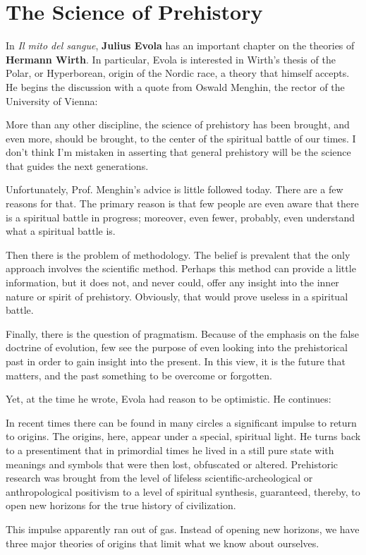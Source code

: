 \section{The Science of Prehistory}

In \emph{Il mito del sangue}, \textbf{Julius Evola} has an important chapter on the theories of \textbf{Hermann Wirth}. In particular, Evola is interested in Wirth's thesis of the Polar, or Hyperborean, origin of the Nordic race, a theory that himself accepts. He begins the discussion with a quote from Oswald Menghin, the rector of the University of Vienna: 

\begin{quotex}
More than any other discipline, the science of prehistory has been brought, and even more, should be brought, to the center of the spiritual battle of our times. I don't think I'm mistaken in asserting that general prehistory will be the science that guides the next generations. 

\end{quotex}
Unfortunately, Prof. Menghin's advice is little followed today. There are a few reasons for that. The primary reason is that few people are even aware that there is a spiritual battle in progress; moreover, even fewer, probably, even understand what a spiritual battle is. 

Then there is the problem of methodology. The belief is prevalent that the only approach involves the scientific method. Perhaps this method can provide a little information, but it does not, and never could, offer any insight into the inner nature or spirit of prehistory. Obviously, that would prove useless in a spiritual battle. 

Finally, there is the question of pragmatism. Because of the emphasis on the false doctrine of evolution, few see the purpose of even looking into the prehistorical past in order to gain insight into the present. In this view, it is the future that matters, and the past something to be overcome or forgotten. 

Yet, at the time he wrote, Evola had reason to be optimistic. He continues: 

\begin{quotex}
In recent times there can be found in many circles a significant impulse to return to origins. The origins, here, appear under a special, spiritual light. He turns back to a presentiment that in primordial times he lived in a still pure state with meanings and symbols that were then lost, obfuscated or altered. Prehistoric research was brought from the level of lifeless scientific-archeological or anthropological positivism to a level of spiritual synthesis, guaranteed, thereby, to open new horizons for the true history of civilization. 

\end{quotex}
This impulse apparently ran out of gas. Instead of opening new horizons, we have three major theories of origins that limit what we know about ourselves. 

